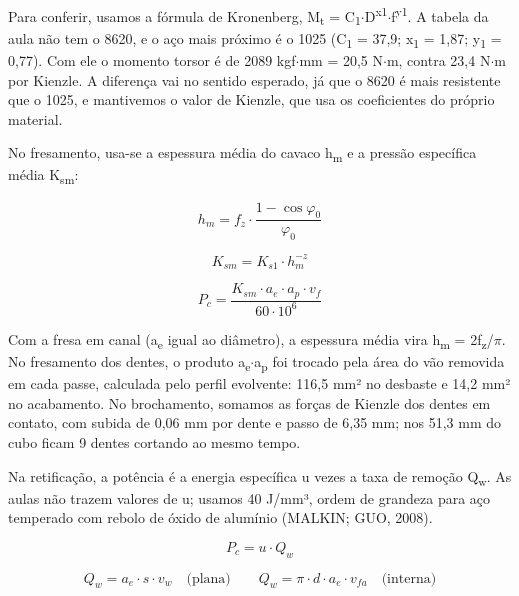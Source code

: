 Para conferir, usamos a fórmula de Kronenberg, M\textsubscript{t} = C\textsubscript{1}$\cdot$D\textsuperscript{x1}$\cdot$f\textsuperscript{y1}. A tabela da aula não tem o 8620, e o aço mais próximo é o 1025 (C\textsubscript{1} = 37,9; x\textsubscript{1} = 1,87; y\textsubscript{1} = 0,77). Com ele o momento torsor é de 2089 kgf$\cdot$mm = 20,5 N$\cdot$m, contra 23,4 N$\cdot$m por Kienzle. A diferença vai no sentido esperado, já que o 8620 é mais resistente que o 1025, e mantivemos o valor de Kienzle, que usa os coeficientes do próprio material.

No fresamento, usa-se a espessura média do cavaco h\textsubscript{m} e a pressão específica média K\textsubscript{sm}:

\begin{equation}\label{eq:hm}
  h_{m} = f_{z} \cdot \frac{1 - \cos \varphi_{0}}{\varphi_{0}}
\end{equation}

\begin{equation}\label{eq:ksm}
  K_{sm} = K_{s1} \cdot h_{m}^{-z}
\end{equation}

\begin{equation}\label{eq:pfres}
  P_{c} = \frac{K_{sm} \cdot a_{e} \cdot a_{p} \cdot v_{f}}{60 \cdot 10^{6}}
\end{equation}

Com a fresa em canal (a\textsubscript{e} igual ao diâmetro), a espessura média vira h\textsubscript{m} = 2f\textsubscript{z}/$\pi$. No fresamento dos dentes, o produto a\textsubscript{e}$\cdot$a\textsubscript{p} foi trocado pela área do vão removida em cada passe, calculada pelo perfil evolvente: 116,5 mm² no desbaste e 14,2 mm² no acabamento. No brochamento, somamos as forças de Kienzle dos dentes em contato, com subida de 0,06 mm por dente e passo de 6,35 mm; nos 51,3 mm do cubo ficam 9 dentes cortando ao mesmo tempo.

Na retificação, a potência é a energia específica u vezes a taxa de remoção Q\textsubscript{w}. As aulas não trazem valores de u; usamos 40 J/mm³, ordem de grandeza para aço temperado com rebolo de óxido de alumínio (MALKIN; GUO, 2008).

\begin{equation}\label{eq:pret}
  P_{c} = u \cdot Q_{w}
\end{equation}

\begin{equation}\label{eq:qw}
  Q_{w} = a_{e} \cdot s \cdot v_{w} \quad \text{(plana)} \qquad Q_{w} = \pi \cdot d \cdot a_{e} \cdot v_{fa} \quad \text{(interna)}
\end{equation}

